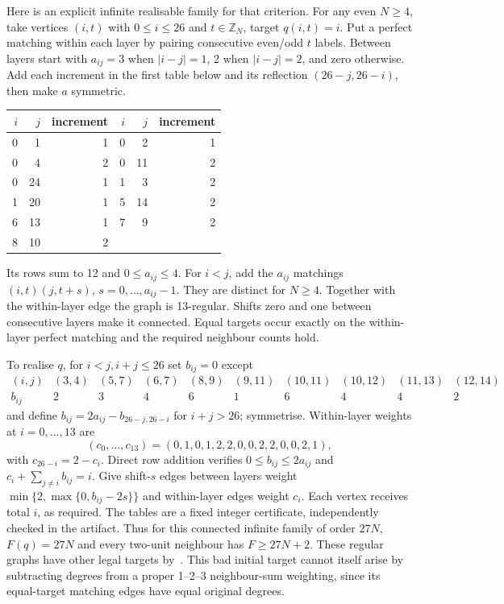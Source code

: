 Here is an explicit infinite realisable family for that criterion.
For any even $N\ge4$, take vertices $(i,t)$ with $0\le i\le26$
and $t\in\mathbb Z_N$, target $q(i,t)=i$. Put a perfect matching
within each layer by pairing consecutive even/odd $t$ labels. Between
layers start with $a_{ij}=3$ when $|i-j|=1$, 2 when $|i-j|=2$,
and zero otherwise. Add each increment in the first table below and
its reflection $(26-j,26-i)$, then make $a$ symmetric.
\begin{center}\small
\begin{tabular}{rrr@{\qquad}rrr}\toprule
$i$&$j$&increment&$i$&$j$&increment\\\midrule
0&1&1&0&2&1\\0&4&2&0&11&2\\0&24&1&1&3&2\\
1&20&1&5&14&2\\6&13&1&7&9&2\\8&10&2&&&\\\bottomrule
\end{tabular}
\end{center}
Its rows sum to 12 and $0\le a_{ij}\le4$. For $i<j$, add the
$a_{ij}$ matchings $(i,t)(j,t+s)$, $s=0,\ldots,a_{ij}-1$.
They are distinct for $N\ge4$. Together with the within-layer edge
the graph is 13-regular. Shifts zero and one between consecutive
layers make it connected. Equal targets occur exactly on the
within-layer perfect matching and the required neighbour counts hold.

To realise $q$, for $i<j,i+j\le26$ set $b_{ij}=0$ except
\[
\begin{array}{c|rrrrrrrrr}
(i,j)&(3,4)&(5,7)&(6,7)&(8,9)&(9,11)&(10,11)&(10,12)&(11,13)&(12,14)\\
b_{ij}&2&3&4&6&1&6&4&4&2
\end{array}
\]
and define $b_{ij}=2a_{ij}-b_{26-j,26-i}$ for $i+j>26$;
symmetrise. Within-layer weights at $i=0,\ldots,13$ are
\[
 (c_0,\ldots,c_{13})=(0,1,0,1,2,2,0,0,2,2,0,0,2,1),
\]
with $c_{26-i}=2-c_i$. Direct row addition verifies
$0\le b_{ij}\le2a_{ij}$ and $c_i+\sum_{j\ne i}b_{ij}=i$.
Give shift-$s$ edges between layers weight
$\min\{2,\max\{0,b_{ij}-2s\}\}$ and within-layer edges weight
$c_i$. Each vertex receives total $i$, as required. The tables are
a fixed integer certificate, independently checked in the artifact.
Thus for this connected infinite family of order $27N$,
$F(q)=27N$ and every two-unit neighbour has $F\ge27N+2$.
These regular graphs have other legal targets by~\cite{GOW26}.
This bad initial target cannot itself arise by subtracting degrees
from a proper 1--2--3 neighbour-sum weighting, since its equal-target
matching edges have equal original degrees.


